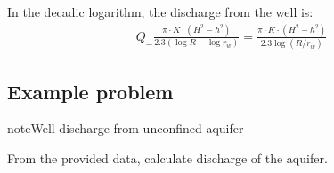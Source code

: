 \documentclass[letterpaper,10pt,english]{jupyterBook}
\begin{document}
\sphinxAtStartPar
In the decadic logarithm, the discharge from the well is:
\begin{equation*}
\begin{split}
Q_= \frac{\pi\cdot K \cdot (H^2-h^2)}{2.3(\log R - \log r_w)} = \frac{\pi\cdot K \cdot (H^2-h^2)}{2.3\log (R/r_w)}
\end{split}
\end{equation*}

\subsection{Example problem}
\label{\detokenize{content/flow/L8/18_wells:id3}}
\begin{sphinxadmonition}{note}{Well discharge from unconfined aquifer}

\sphinxAtStartPar
From the provided data, calculate discharge of the aquifer.
\end{sphinxadmonition}
\end{document}
